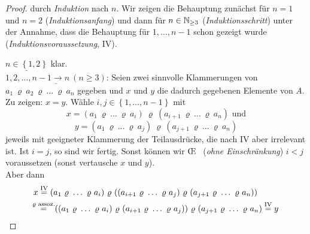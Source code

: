 \documentclass[../../main.tex]{subfiles}
\begin{document}
\begin{proof}
durch \emph{Induktion} nach $n$. Wir zeigen die Behauptung zunächst für $n=1$ und $n=2$ (\emph{Induktionsanfang}) und dann für $n\in\mathbb N_{\geq 3}$ (\emph{Induktionsschritt}) unter der Annahme, dass die Behauptung für $1,\ldots,n-1$ schon gezeigt wurde (\emph{Induktionsvoraussetzung}, IV).
\begin{center}
\end{center}
$\underline{n\in\left\{1,2\right\}}$ klar.\\
$\underline{1,2,\ldots,n-1\rightarrow n ~(n\geq 3)}$: Seien zwei sinnvolle Klammerungen von $a_1~\varrho~ a_2~\varrho~ \ldots ~\varrho~ a_n$ gegeben und $x$ und $y$ die dadurch gegebenen Elemente von $A$.\\
Zu zeigen: $x=y$. Wähle $i,j\in\left\{1,\ldots,n-1\right\}$ mit
$$x=(a_1~\varrho~\ldots~\varrho~ a_i)~\varrho~(a_{i+1}~\varrho~\ldots~\varrho~ a_n)\text{ und}$$
$$y=(a_1~\varrho~\ldots~\varrho~ a_j)~\varrho~ (a_{j+1}~\varrho~\ldots~\varrho~ a_n)$$
jeweils mit geeigneter Klammerung der Teilausdrücke, die nach IV aber irrelevant ist. Ist $i=j$, so sind wir fertig. Sonst können wir \OE~ (\emph{ohne Einschränkung}) $i<j$ voraussetzen (sonst vertausche $x$ und $y$).\\
Aber dann
\begin{align*}
x & \overset{\text{IV}}=(a_1~\varrho~\ldots~\varrho~ a_i)~\varrho~((a_{i+1}~\varrho~\ldots~\varrho~ a_j)~\varrho~(a_{j+1} ~\varrho~\ldots~\varrho~ a_n))\\
&\overset{\mathclap{\varrho \text{ assoz.}}}= ~~((a_1~\varrho~ \ldots~\varrho~ a_i)~\varrho~(a_{i+1}~\varrho~\ldots~\varrho~ a_j))~\varrho~(a_{j+1}~\varrho~\ldots~\varrho~ a_n)\overset{\text{IV}}=y
\end{align*}
\end{proof}
\end{document}
